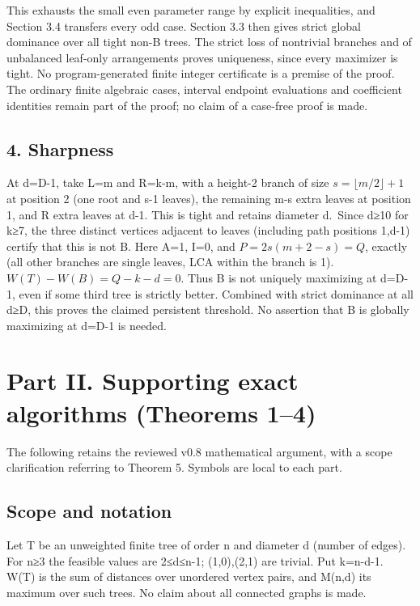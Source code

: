 \documentclass[
  10pt,
  a4paper,
]{article}
\begin{document}
This exhausts the small even parameter range by explicit inequalities,
and Section 3.4 transfers every odd case. Section 3.3 then gives strict
global dominance over all tight non-B trees. The strict loss of
nontrivial branches and of unbalanced leaf-only arrangements proves
uniqueness, since every maximizer is tight. No program-generated finite
integer certificate is a premise of the proof. The ordinary finite
algebraic cases, interval endpoint evaluations and coefficient
identities remain part of the proof; no claim of a case-free proof is
made.

\subsection{4. Sharpness}\label{sharpness}

At d=D-1, take L=m and R=k-m, with a height-2 branch of size
\(s=\lfloor m/2\rfloor+1\) at position 2 (one root and s-1 leaves), the
remaining m-s extra leaves at position 1, and R extra leaves at d-1.
This is tight and retains diameter d.~Since d≥10 for k≥7, the three
distinct vertices adjacent to leaves (including path positions 1,d-1)
certify that this is not B. Here A=1, I=0, and \(P=2s(m+2-s)=Q\),
exactly (all other branches are single leaves, LCA within the branch is
1). \(W(T)-W(B)=Q-k-d=0\). Thus B is not uniquely maximizing at d=D-1,
even if some third tree is strictly better. Combined with strict
dominance at all d≥D, this proves the claimed persistent threshold. No
assertion that B is globally maximizing at d=D-1 is needed.

\section{Part II. Supporting exact algorithms (Theorems
1--4)}\label{part-ii.-supporting-exact-algorithms-theorems-14}

The following retains the reviewed v0.8 mathematical argument, with a
scope clarification referring to Theorem 5. Symbols are local to each
part.

\subsection{Scope and notation}\label{scope-and-notation}

Let T be an unweighted finite tree of order n and diameter d (number of
edges). For n≥3 the feasible values are 2≤d≤n-1; (1,0),(2,1) are
trivial. Put k=n-d-1. W(T) is the sum of distances over unordered vertex
pairs, and M(n,d) its maximum over such trees. No claim about all
connected graphs is made.
\end{document}
